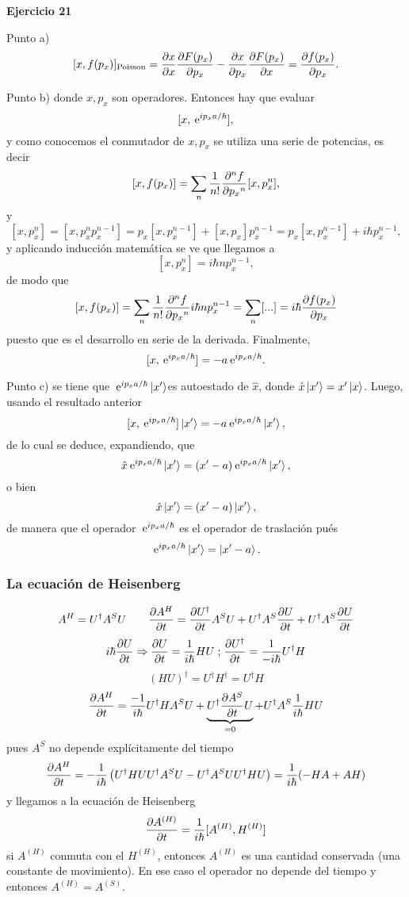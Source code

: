 \documentclass[10pt,oneside]{CBFT_book}
\begin{document}
\begin{ejemplo}{\bf Ejercicio 21}

Punto a)
\[
	[x,f(p_x)]_{\text{Poisson}} = \dpar{x}{x} \dpar{F(p_x)}{p_x} - \dpar{x}{p_x} \dpar{F(p_x)}{x}
	= \dpar{f(p_x)}{p_x}.
\]

Punto b) donde $x, p_x$ son operadores. Entonces hay que evaluar
\[
	[x,\euler^{i p_x a / \hbar} ] ,
\]
y como conocemos el conmutador de $x, p_x$ se utiliza una serie de potencias, es decir
\[
	[x,f(p_x)] = \sum_n \frac{1}{n!} \dpar[n]{f}{p_x}[x,p_x^n],
\]
y
\[
	[x,p_x^n] = [x,p_x^n p_x^{n-1}] = p_x [x,p_x^{n-1}] + [x,p_x] p_x^{n-1} =
	p_x [x,p_x^{n-1}] + i \hbar p_x^{n-1},
\]
y aplicando inducción matemática se ve que llegamos a
\[
	[x,p_x^n] = i \hbar n p_x^{n-1},
\]
de modo que
\[
	[x,f(p_x)] = \sum_n \frac{1}{n!} \dpar[n]{f}{p_x} i \hbar n p_x^{n-1} =
	\sum_n [...] = i \hbar \dpar{f(p_x)}{p_x}
\]
puesto que es el desarrollo en serie de la derivada. Finalmente,
\[
	[ x, \euler^{i p_x a / \hbar} ] = - a \euler^{ i p_x a / \hbar }.
\]

Punto c) se tiene que $\euler^{ i p_x a /\hbar} \Ket{x'} $es autoestado de $\hat{x}$, donde
$ \hat{x} \Ket{x'} = x' \Ket{x}$. Luego, usando el resultado anterior
\[
	[ x, \euler^{i p_x a / \hbar} ] \Ket{x'} = - a \euler^{ i p_x a / \hbar } \Ket{x'},
\]
de lo cual se deduce, expandiendo, que
\[
	\hat{x} \euler^{i p_x a / \hbar} \Ket{x'} = (x'-a) \euler^{i p_x a / \hbar} \Ket{x'},
\]
o bien
\[
	\hat{x} \Ket{x'} = (x'-a) \Ket{x'},
\]
de manera que el operador $\euler^{i p_x a / \hbar}$ es el operador de traslación pués
\[
	\euler^{i p_x a / \hbar} \Ket{x'} = \Ket{ x'- a }.
\]
 
\end{ejemplo}


\subsubsection{La ecuación de Heisenberg}

\[
	A^H = U^\dagger A^S U \qquad \dpar{A^H}{t} = \dpar{U^\dagger}{t}A^S U + U^\dagger A^S \dpar{U}{t} +
	U^\dagger A^S \dpar{U}{t}
\]
\[
	i\hbar \dpar{U}{t} \Rightarrow  \dpar{U}{t} = \frac{1}{i\hbar}HU \; \text{;} \;
	\dpar{U^\dagger}{t} = \frac{1}{-i\hbar}U^\dagger H
\]
\[
	(HU)^\dagger = U^\dagger H^\dagger = U^\dagger H 
\]
\[
	\dpar{A^H}{t} = \frac{-1}{i\hbar} U^\dagger H A^S U + \underbrace{U^\dagger\dpar{A^S}{t} U}_{=0} +
	U^\dagger A^S \frac{1}{i\hbar} H U
\]
pues $A^S$ no depende explícitamente del tiempo
\[
	\dpar{A^H}{t} = -\frac{1}{i\hbar} \left( U^\dagger HUU^\dagger A^SU -U^\dagger A^S U U^\dagger 
	HU \right) =	\frac{1}{i\hbar}(-HA + AH)
\]
y llegamos a la ecuación de Heisenberg
\[
	\dpar{A^{(H)}}{t} = \frac{1}{i\hbar} [ A^{(H)}, H^{(H)}]
\]
si $A^{(H)}$ conmuta con el $H^{(H)}$, entonces $A^{(H)}$ es una cantidad conservada (una constante de movimiento).
En ese caso el operador no depende del tiempo y entonces $A^{(H)} = A^{(S)}$.
\end{document}
